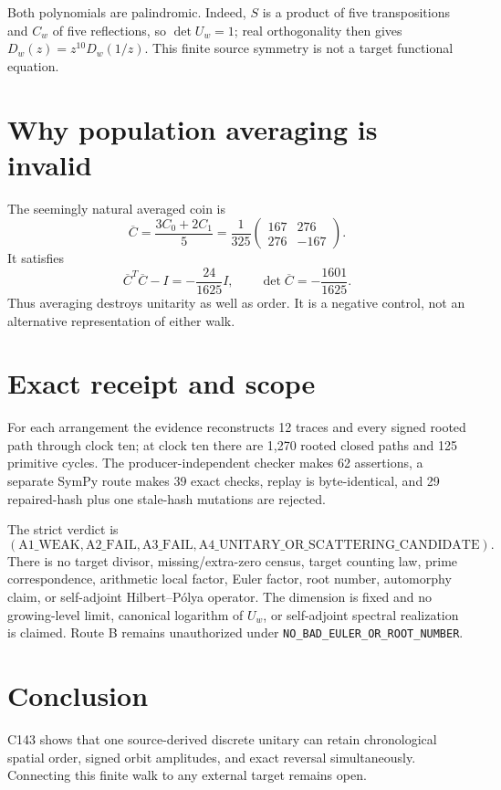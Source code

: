 \documentclass[11pt]{article}
\begin{document}
Both polynomials are palindromic.  Indeed, $S$ is a product of five
transpositions and $C_w$ of five reflections, so $\det U_w=1$; real
orthogonality then gives $D_w(z)=z^{10}D_w(1/z)$.  This finite source
symmetry is not a target functional equation.

\section{Why population averaging is invalid}
The seemingly natural averaged coin is
\[
 \overline C=\frac{3C_0+2C_1}{5}
 =\frac1{325}\begin{pmatrix}167&276\\276&-167\end{pmatrix}.
\]
It satisfies
\[
 \overline C^{T}\overline C-I=-\frac{24}{1625}I,\qquad
 \det\overline C=-\frac{1601}{1625}.
\]
Thus averaging destroys unitarity as well as order.  It is a negative
control, not an alternative representation of either walk.

\section{Exact receipt and scope}
For each arrangement the evidence reconstructs 12 traces and every signed
rooted path through clock ten; at clock ten there are 1,270 rooted closed
paths and 125 primitive cycles.  The producer-independent checker makes 62
assertions, a separate SymPy route makes 39 exact checks, replay is
byte-identical, and 29 repaired-hash plus one stale-hash mutations are
rejected.

The strict verdict is
\[
 (\mathrm{A1\_WEAK},\mathrm{A2\_FAIL},\mathrm{A3\_FAIL},
 \mathrm{A4\_UNITARY\_OR\_SCATTERING\_CANDIDATE}).
\]
There is no target divisor, missing/extra-zero census, target counting law,
prime correspondence, arithmetic local factor, Euler factor, root number,
automorphy claim, or self-adjoint Hilbert--P\'olya operator.  The dimension is
fixed and no growing-level limit, canonical logarithm of $U_w$, or
self-adjoint spectral realization is claimed.  Route B remains unauthorized
under \texttt{NO\_BAD\_EULER\_OR\_ROOT\_NUMBER}.

\section{Conclusion}
C143 shows that one source-derived discrete unitary can retain chronological
spatial order, signed orbit amplitudes, and exact reversal simultaneously.
Connecting this finite walk to any external target remains open.
\end{document}
